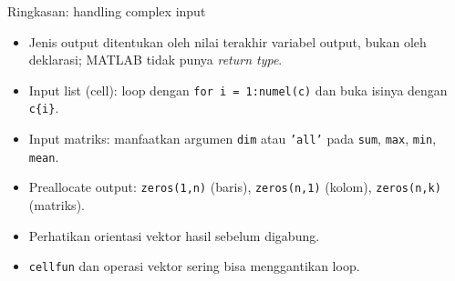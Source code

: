 \documentclass[aspectratio=169,11pt]{beamer}
\begin{document}
\begin{frame}{Ringkasan: handling complex input}
\small
\begin{itemize}
  \item Jenis output ditentukan oleh \alert{nilai terakhir} variabel output,
        bukan oleh deklarasi; MATLAB tidak punya \emph{return type}.
  \item Input list (cell): loop dengan \texttt{for i = 1:numel(c)} dan buka
        isinya dengan \texttt{c\{i\}}.
  \item Input matriks: manfaatkan argumen \texttt{dim} atau \texttt{'all'} pada
        \texttt{sum}, \texttt{max}, \texttt{min}, \texttt{mean}.
  \item Preallocate output: \texttt{zeros(1,n)} (baris), \texttt{zeros(n,1)}
        (kolom), \texttt{zeros(n,k)} (matriks).
  \item Perhatikan orientasi vektor hasil sebelum digabung.
  \item \texttt{cellfun} dan operasi vektor sering bisa menggantikan loop.
\end{itemize}
\end{frame}
\end{document}
